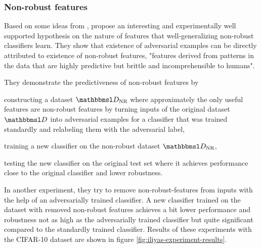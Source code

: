 \documentclass[twocolumn]{article}
\begin{document}
\subsubsection{Non-robust features}

Based on some ideas from \citet{Tsipras:2018:RMBOA},  \citet{Ilyas:2019:AENBTF} propose an interesting and experimentally well supported hypothesis on the nature of features that well-generalizing non-robust classifiers learn. They show that existence of adversarial examples can be directly attributed to existence of  non-robust features, "features derived from patterns in the data that are highly predictive but brittle and incomprehensible to humans". 

They demonstrate the predictiveness of non-robust features by 
\begin{solidenumerate}
	\item constructing a dataset $\set D_\text{NR}$ where approximately the only useful features are non-robust features by turning inputs of the original dataset $\set D$ into adversarial examples for a classifier that was trained standardly and relabeling them with the adversarial label,
	\item training a new classifier on the non-robust dataset $\set D_\text{NR}$,
	\item testing the new classifier on the original test set where it achieves performance close to the original classifier and lower robustness.
\end{solidenumerate}

In another experiment, they try to remove non-robust-features from inputs with the help of an adversarially trained classifier. A new classifier trained on the dataset with removed non-robust features achieves a bit lower performance and robustness not as high as the adversarially trained classifier but quite significant compared to the standardly trained classifier. Results of these experiments with the CIFAR-10 dataset \citep{Krizhevsky:2009:LMLFTI} are shown in figure \ref{fig:iliyas-experiment-results}.
\end{document}

